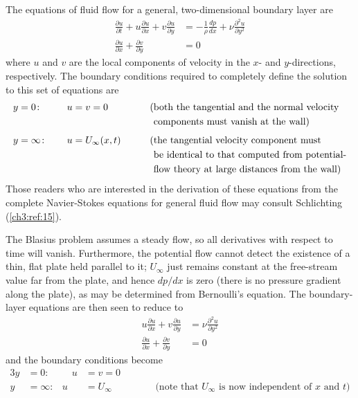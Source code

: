 The equations of fluid flow for a general, two-dimensional boundary layer are
\begin{align}
\frac{\partial u}{\partial t} + u\frac{\partial u}{\partial x}
  + v\frac{\partial u}{\partial y}
  &= -\frac{1}{\rho}\frac{dp}{dx} + \nu\frac{\partial^2 u}{\partial y^2}
  \label{ch3:eq:38}\\
\frac{\partial u}{\partial x} + \frac{\partial v}{\partial y} &= 0
  \label{ch3:eq:39}
\end{align}
where $u$ and $v$ are the local components of velocity in the $x$- and
$y$-directions, respectively. The boundary conditions required to completely
define the solution to this set of equations are
\begin{alignat*}{3}
y &= 0\colon &\quad u &= v = 0 &\qquad&
  \text{(both the tangential and the normal velocity}\\
&&&&& \text{\phantom{(}components must vanish at the wall)}\\[1ex]
y &= \infty\colon & u &= U_\infty(x,t) &&
  \text{(the tangential velocity component must}\\
&&&&& \text{\phantom{(}be identical to that computed from potential-}\\
&&&&& \text{\phantom{(}flow theory at large distances from the wall)}
\end{alignat*}
Those readers who are interested in the derivation of these equations from the
complete Navier-Stokes equations for general fluid flow may consult
Schlichting (\ref{ch3:ref:15}).

The Blasius problem assumes a steady flow, so all derivatives with respect to
time will vanish. Furthermore, the potential flow cannot detect the existence
of a thin, flat plate held parallel to it; $U_\infty$ just remains constant at
the free-stream value far from the plate, and hence $dp/dx$ is zero (there is
no pressure gradient along the plate), as may be determined from Bernoulli's
equation. The boundary-layer equations are then seen to reduce to
\begin{align}
u\frac{\partial u}{\partial x} + v\frac{\partial u}{\partial y}
  &= \nu\frac{\partial^2 u}{\partial y^2} \label{ch3:eq:40}\\
\frac{\partial u}{\partial x} + \frac{\partial v}{\partial y} &= 0
  \label{ch3:eq:41}
\end{align}
and the boundary conditions become
\begin{alignat*}{3}
y &= 0\colon &\quad u &= v = 0\\
y &= \infty\colon & u &= U_\infty &\qquad&
  \text{(note that $U_\infty$ is now independent of $x$ and $t$)}
\end{alignat*}

